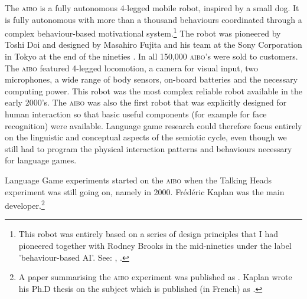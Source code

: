 The \textsc{aibo} is a fully autonomous 4-legged mobile robot, inspired by a small dog. It is fully autonomous with more than 
a thousand behaviours coordinated through a complex behaviour-based motivational 
system.\footnote{This robot was entirely based on a series of design principles that I had pioneered together with Rodney 
Brooks in the mid-nineties under the label 'behaviour-based AI'. See: \cite{Steels:1995}, \cite{Steels:1994}.}
The robot was pioneered by
Toshi Doi and designed by Masahiro Fujita and his team at the Sony Corporation in Tokyo at the end of 
the nineties \citep{Fujita:1998}. 
In all 150,000 \textsc{aibo}'s were sold to customers. The \textsc{aibo} featured 4-legged locomotion, 
a camera for visual input, two microphones, a wide range of body sensors, on-board batteries and the necessary 
computing power. This robot was the most complex reliable robot available in the early 2000's. 
The \textsc{aibo} was also the first robot that was explicitly designed for 
human interaction so that basic useful components (for example for face recognition) were available. Language game research
could therefore focus entirely on the linguistic and conceptual aspects of the semiotic cycle, even though 
we still had to program the physical interaction patterns and behaviours necessary for language games. 

Language Game experiments started on the \textsc{aibo} when the Talking Heads experiment 
was still going on, namely in 2000. Fr\'{e}d\'{e}ric Kaplan was the main developer.\footnote{A paper summarising 
the \textsc{aibo} experiment was published as \cite{Steels:2001}. Kaplan wrote his Ph.D thesis on the subject 
which is published (in French) as \cite{Kaplan:2001}.}

